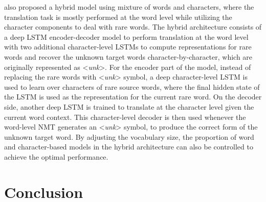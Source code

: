 \documentclass[12pt]{extarticle}
\begin{document}
\citep{luong-manning-2016-achieving} also proposed a hybrid model using mixture of words and characters, where the translation task is mostly performed at the word level while utilizing the character components to deal with rare words. The hybrid architecture consists of a deep LSTM encoder-decoder model to perform translation at the word level with two additional character-level LSTMs to compute representations for rare words and recover the unknown target words character-by-character, which are originally represented as \textless \textit{unk}\textgreater{}. For the encoder part of the model, instead of replacing the rare words with \textless \textit{unk}\textgreater{} symbol, a deep character-level LSTM is used to learn over characters of rare source words, where the final hidden state of the LSTM is used as the representation for the current rare word. On the decoder side, another deep LSTM is trained to translate at the character level given the current word context. This character-level decoder is then used whenever the word-level NMT generates an \textless \textit{unk}\textgreater{} symbol, to produce the correct form of the unknown target word. By adjusting the vocabulary size, the proportion of word and character-based models in the hybrid architecture can also be controlled to achieve the optimal performance.




\section*{Conclusion}

\newpage

\end{document}
